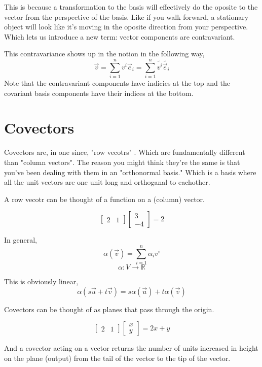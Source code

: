 \documentclass[12pt]{book}
\theoremstyle{plain}
\theoremstyle{definition}
\theoremstyle{ppart}
\theoremstyle{case}
\theoremstyle{solution}
\begin{document}
This is because \cite{youtube:tensor3} a transformation to the basis will effectively do the oposite to the vector from the perspective of the basis.
Like if you walk forward, a stationary object will look like it's moving in the oposite direction from your perspective.
Which lets us introduce a new term: vector components are contravariant.

This contravariance shows up in the notion in the following way,
\[ \vec{v} = \sum_{i=1}^n v^i \vec{e}_i = \sum_{i=1}^n \widetilde{v^i} \widetilde{\vec{e}_i} \]
Note that the contravariant components have indicies at the top and the covariant basis components have their indices at the bottom.

\chapter{Covectors}

Covectors are, in one since, "row vecotrs" \cite{youtube:tensor4}. Which are fundamentally different than "column vectors".
The reason you might think they're the same is that you've been dealing with them in an "orthonormal basis." Which is a basis
where all the unit vectors are one unit long and orthoganal to eachother.

A row vecotr can be thought of a function on a (column) vector.

\[
  \begin{bmatrix}
  2 & 1
  \end{bmatrix}
  \begin{bmatrix}
  3 \\ -4
  \end{bmatrix}
  = 2
\]

In general,
\[ \alpha(\vec{v}) = \sum_{i=1}^n \alpha_i v^i \]
\[ \alpha : V \to \mathbb{R} \]

This is obviously linear,
\[ \alpha(s \vec{u} + t \vec{v}) = s \alpha(\vec{u}) + t \alpha(\vec{v}) \]

Covectors can be thought of as planes that pass through the origin.

\[
  \begin{bmatrix}
  2 & 1
  \end{bmatrix}
  \begin{bmatrix}
  x \\ y
  \end{bmatrix}
  = 2x+y
\]

And a covector acting on a vector returns the number of units increased in height on the plane
(output) from the tail of the vector to the tip of the vector.
\end{document}
